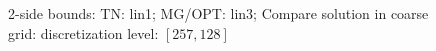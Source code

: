 \documentclass[10pt]{article}
\begin{document}
\begin{figure}[H]
  \centering
  \caption{2-side bounds: TN: lin1; MG/OPT: lin3; Compare solution in coarse grid: discretization level: $[257,128]$}
  \label{fig:coarse}
\end{figure}
\end{document}
